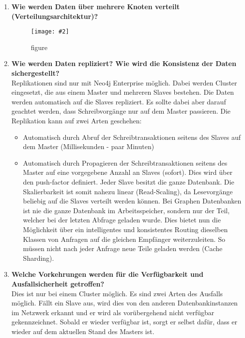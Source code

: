 \documentclass[a4paper,10pt,titlepage=false]{scrreprt}
\newcommand{\pic}[2][figure]{\begin{figure}[h]
 \centering
 \texttt{[image: \#2]}
 \caption{#1}
\end{figure}
}
\begin{document}
\begin{itemize}
\begin{enumerate}
\item \textbf{Wie werden Daten über mehrere Knoten verteilt (Verteilungsarchitektur)?}\\
\pic{n4jvt.png}
\item \textbf{Wie werden Daten repliziert? Wie wird die Konsistenz der Daten sichergestellt?} \\
Replikationen sind nur mit Neo4j Enterprise möglich. Dabei werden Cluster eingesetzt, die aus einem Master und mehreren Slaves bestehen. Die Daten werden automatisch auf die Slaves repliziert. Es sollte dabei aber darauf geachtet werden, dass Schreibvorgänge nur auf dem Master passieren. Die Replikation kann auf zwei Arten geschehen:
\begin{itemize}
\item Automatisch durch Abruf der Schreibtransaktionen seitens des Slaves auf dem Master (Millisekunden - paar Minuten)
\item  Automatisch durch Propagieren der Schreibtransaktionen seitens des Master auf eine vorgegebene Anzahl an Slaves (sofort). Dies wird über den push-factor definiert.
Jeder Slave besitzt die ganze Datenbank. Die Skalierbarkeit ist somit nahezu linear (Read-Scaling), da Lesevorgänge beliebig auf die Slaves verteilt werden können.
Bei Graphen Datenbanken ist nie die ganze Datenbank im Arbeitsspeicher, sondern nur der Teil, welcher bei der letzten Abfrage geladen wurde. Dies bietet nun die Möglichkeit über ein intelligentes und konsistentes Routing dieselben Klassen von Anfragen auf die gleichen Empfänger weiterzuleiten. So müssen nicht nach jeder Anfrage neue Teile geladen werden (Cache Sharding).
\end{itemize}
\item \textbf{Welche Vorkehrungen werden für die Verfügbarkeit und Ausfallsicherheit getroffen?}\\
Dies ist nur bei einem Cluster möglich. Es sind zwei Arten des Ausfalls möglich.
Fällt ein Slave aus, wird dies von den anderen Datenbankinstanzen im Netzwerk erkannt und er wird als vorübergehend nicht verfügbar gekennzeichnet. Sobald er wieder verfügbar ist, sorgt er selbst dafür, dass er wieder auf dem aktuellen Stand des Masters ist.


\end{enumerate}
\end{itemize}
\end{document}
